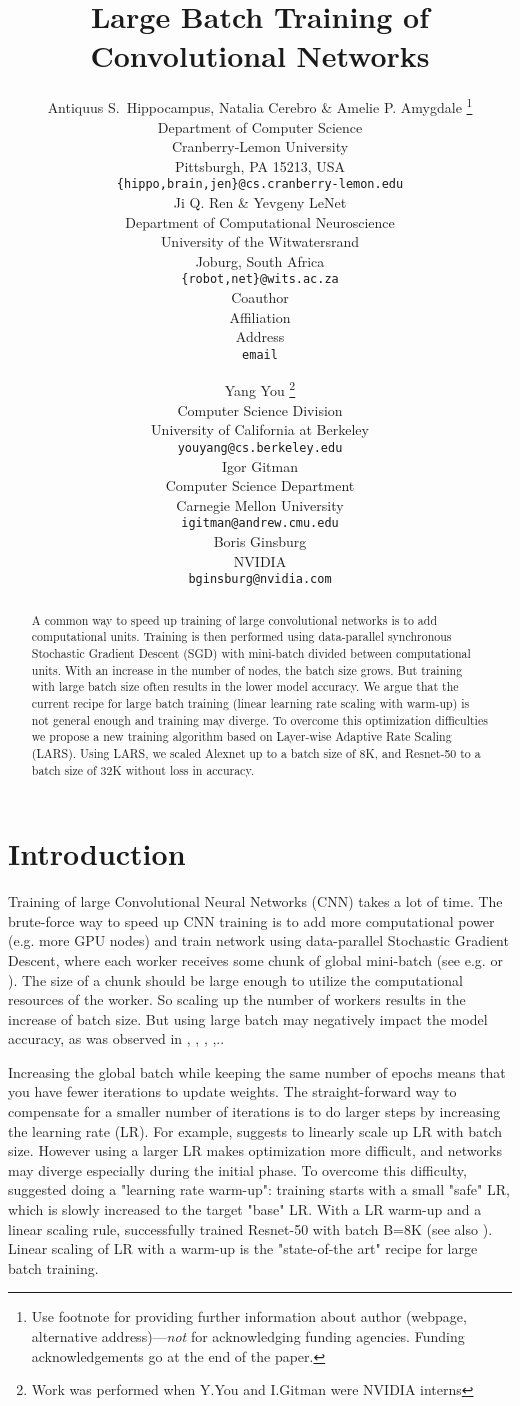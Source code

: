 \documentclass{article} %
\title{Large Batch Training of Convolutional Networks}
\author{Antiquus S.~Hippocampus, Natalia Cerebro \& Amelie P. Amygdale \thanks{ Use footnote for providing further information
about author (webpage, alternative address)---\emph{not} for acknowledging
funding agencies.  Funding acknowledgements go at the end of the paper.} \\
Department of Computer Science\\
Cranberry-Lemon University\\
Pittsburgh, PA 15213, USA \\
\texttt{\{hippo,brain,jen\}@cs.cranberry-lemon.edu} \\
\And
Ji Q. Ren \& Yevgeny LeNet \\
Department of Computational Neuroscience \\
University of the Witwatersrand \\
Joburg, South Africa \\
\texttt{\{robot,net\}@wits.ac.za} \\
\AND
Coauthor \\
Affiliation \\
Address \\
\texttt{email}
}
\author {Yang You  
\thanks{Work was performed when Y.You and I.Gitman were NVIDIA interns } \\
Computer Science Division\\
University of California at Berkeley \\
\texttt{youyang@cs.berkeley.edu} \\
\And 
Igor Gitman\\
Computer Science Department \\
Carnegie Mellon University \\
\texttt{igitman@andrew.cmu.edu} \\
\And Boris Ginsburg\\
NVIDIA \\
\texttt{bginsburg@nvidia.com} \\
}
\begin{document}
\maketitle

\begin{abstract}
A common way to speed up training of large convolutional networks is to add  computational units. Training is then performed using data-parallel synchronous Stochastic Gradient Descent (SGD) with mini-batch divided between computational units. With an increase in the number of nodes, the batch size grows. But training with large batch size often results in the lower model accuracy. We argue that the current recipe for large batch training (linear learning rate scaling with warm-up) is not general enough and training may diverge. To overcome this optimization difficulties we propose a new training algorithm based on Layer-wise Adaptive Rate Scaling (LARS). Using LARS, we scaled Alexnet up to a batch size of 8K, and Resnet-50 to a batch size of 32K without loss in accuracy.

\end{abstract}

\section{Introduction}
\label{sec:intro}

Training of large Convolutional Neural Networks (CNN) takes a lot of time. The brute-force way to speed up CNN training is to add more computational power (e.g. more GPU nodes) and train network using data-parallel Stochastic Gradient Descent, where each worker receives some chunk of global mini-batch (see e.g.  \cite{krizhevsky2014one} or \cite{goyal2017accurate} ).  The size of a chunk should be large enough to utilize the computational resources of the worker. So scaling up the number of workers results in the increase of batch size. But using large batch may negatively impact the model accuracy, as was observed in \cite{krizhevsky2014one},  \cite{li2014efficient}, \cite{keskar2016large}, \cite{hoffer2017train},.. 

 Increasing the global batch while keeping the same number of epochs means that you have fewer iterations to update weights. The straight-forward way to compensate for a smaller number of iterations is to do larger steps by increasing the learning rate (LR). For example,  \cite{krizhevsky2014one} suggests to linearly scale up LR with batch size. However using a larger LR makes optimization more difficult, and networks may diverge especially during the initial phase. To overcome this difficulty,  \cite{goyal2017accurate} suggested doing a "learning rate warm-up": training starts with a small "safe" LR, which is slowly increased to the target "base" LR.  With a LR warm-up and a linear scaling rule,  \cite{goyal2017accurate} successfully trained Resnet-50 with batch B=8K (see also \cite{Cho2017poweraiddl}).    
Linear scaling of LR with a warm-up is the "state-of-the art" recipe for large batch training.
\end{document}
